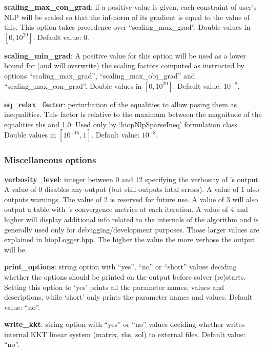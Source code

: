 \noindent \textbf{scaling_max_con_grad}: if a positive value is given, each constraint of user's NLP will be scaled so that the inf-norm of its gradient is equal to the value of this. This option takes precedence over ``scaling\_max\_grad''. Double values in $[0, 10^{20}]$. Default value: $0$.
\medskip

\noindent \textbf{scaling\_min\_grad}: A positive value for this option will be used as a lower bound for (and will overwrite) the scaling factors computed as instructed by options ``scaling\_max\_grad'', ``scaling\_max\_obj\_grad'' and ``scaling\_max\_con\_grad''. Double values in $[0, 10^{20}]$. Default value: $10^{-8}$.
\medskip

\noindent \textbf{eq\_relax\_factor}: perturbation of the equalities to allow posing them as inequalities. This factor is relative to the maximum between the magnitude of the equalities rhs and 1.0. Used only by `hiopNlpSparseIneq' formulation class. Double values in $[10^{-15}, 1]$. Default value: $10^{-8}$.
\medskip




\subsubsection{Miscellaneous options}

\noindent \textbf{verbosity\_level}: integer between $0$ and $12$ specifying the verbosity of \Hi's output. A value of $0$ disables any output (but still outputs fatal errors). A value of $1$ also outputs warnings. The value of $2$ is reserved for future use. A value of $3$ will also output a table with \Hi's convergence metrics at each iteration. A value of $4$ and higher will display additional info related to the internals of the algorithm and is generally used only for debugging/development purposes. Those larger values are explained in hiopLogger.hpp. The higher the value the more verbose the output will be.
\medskip

\noindent \textbf{print\_options}: string option with ``yes'', ``no'' or ``short'' values deciding whether the options should be printed on the output before solver (re)starts. Setting this option to `yes' prints all the parameter names, values and descriptions, while `short' only prints the parameter names and values. Default value: ``no''.
\medskip

\noindent \textbf{write\_kkt}: string option with ``yes'' or ``no'' values deciding whether \Hi writes internal KKT linear system (matrix, rhs, sol) to external files. Default value: ``no''.
\medskip

